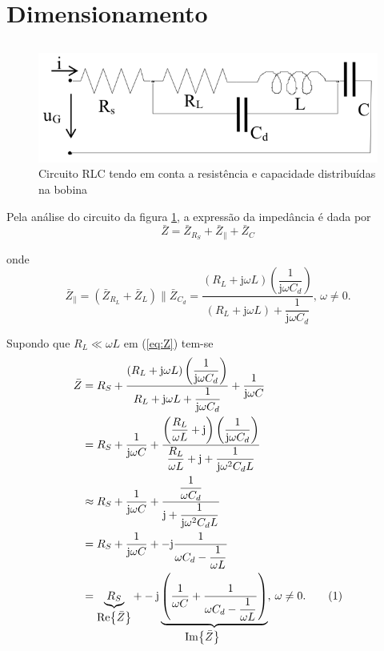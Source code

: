 \documentclass[a4paper, titlepage, portuguese]{article}
\newcommand\numberthis{\addtocounter{equation}{1}\tag{\theequation}}
\begin{document}

	\section{Dimensionamento}
	\subsection{}
		\begin{figure}[h]
			\centering
			\includegraphics[width=0.6\linewidth]{circuito2.png}
			\caption{Circuito RLC tendo em conta a resistência e capacidade distribuídas na bobina}
			\label{fig:circuito2}
		\end{figure}
		\par
		Pela análise do circuito da figura \ref{fig:circuito2}, a expressão da impedância é dada por
		\begin{equation}
			\bar{Z} = \bar{Z}_{R_S} + \bar{Z}_{\parallel} + \bar{Z}_C
			\label{eq:Z}
		\end{equation}
		\par
		onde
		\begin{equation}
			\bar{Z}_{\parallel} = (\bar{Z}_{R_L} + \bar{Z}_{L}) \parallel \bar{Z}_{C_d} = \dfrac{\left(R_L + \mathrm{j} \omega L\right)\left(\dfrac{1}{\mathrm{j} \omega C_d}\right)}{(R_L + \mathrm{j} \omega L) + \dfrac{1}{\mathrm{j} \omega C_d}}, \hspace{2pt}\omega \neq 0.
		\end{equation}
		\par
		Supondo que $R_L \ll \omega L$ em (\ref{eq:Z}) tem-se
		\begin{align*}
			\bar{Z} &= R_S + \dfrac{\left(R_L + \mathrm{j} \omega L\right)\left(\dfrac{1}{\mathrm{j} \omega C_d}\right)}{R_L + \mathrm{j} \omega L + \dfrac{1}{\mathrm{j} \omega C_d}} + \dfrac{1}{\mathrm{j} \omega C} \\
			&= R_S + \dfrac{1}{\mathrm{j} \omega C} + \dfrac{\left(\dfrac{R_L}{\omega L} + \mathrm{j}\right)\left(\dfrac{1}{\mathrm{j} \omega C_d}\right)}{\dfrac{R_L}{\omega L} + \mathrm{j} + \dfrac{1}{\mathrm{j} \omega^2 C_d L}} \\
			&\approx R_S + \dfrac{1}{\mathrm{j} \omega C} + \dfrac{\dfrac{1}{\omega C_d}}{\mathrm{j} + \dfrac{1}{\mathrm{j} \omega^2 C_d L}} \nonumber \\
			&= R_S + \dfrac{1}{\mathrm{j} \omega C} + -\mathrm{j}\dfrac{1}{\omega C_d - \dfrac{1}{\omega L}} \\
			&= \underbrace{R_S}_{\scalebox{1}{$\Re{\bar{Z}}$}} + -\mathrm{j}\underbrace{\left(\dfrac{1}{\omega C} + \dfrac{1}{\omega C_d - \dfrac{1}{\omega L}}\right)}_{\scalebox{1}{$\Im{\bar{Z}}$}}, \hspace{2pt}\omega \neq 0. \numberthis \\
		\end{align*}
\end{document}

